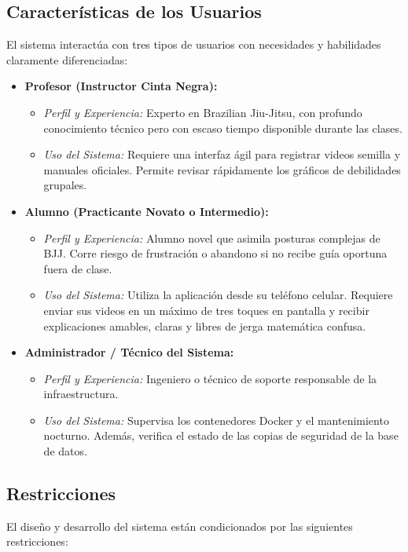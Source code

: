 \documentclass[12pt,letterpaper]{article}
\begin{document}
\subsection{Características de los Usuarios}
El sistema interactúa con tres tipos de usuarios con necesidades y habilidades claramente diferenciadas:

\begin{itemize}
    \item \textbf{Profesor (Instructor Cinta Negra):}
    \begin{itemize}
        \item \textit{Perfil y Experiencia:} Experto en Brazilian Jiu-Jitsu, con profundo conocimiento técnico pero con escaso tiempo disponible durante las clases.
        \item \textit{Uso del Sistema:} Requiere una interfaz ágil para registrar videos semilla y manuales oficiales. Permite revisar rápidamente los gráficos de debilidades grupales.
    \end{itemize}
    \item \textbf{Alumno (Practicante Novato o Intermedio):}
    \begin{itemize}
        \item \textit{Perfil y Experiencia:} Alumno novel que asimila posturas complejas de BJJ. Corre riesgo de frustración o abandono si no recibe guía oportuna fuera de clase.
        \item \textit{Uso del Sistema:} Utiliza la aplicación desde su teléfono celular. Requiere enviar sus videos en un máximo de tres toques en pantalla y recibir explicaciones amables, claras y libres de jerga matemática confusa.
    \end{itemize}
    \item \textbf{Administrador / Técnico del Sistema:}
    \begin{itemize}
        \item \textit{Perfil y Experiencia:} Ingeniero o técnico de soporte responsable de la infraestructura.
        \item \textit{Uso del Sistema:} Supervisa los contenedores Docker y el mantenimiento nocturno. Además, verifica el estado de las copias de seguridad de la base de datos.
    \end{itemize}
\end{itemize}

\subsection{Restricciones}
El diseño y desarrollo del sistema están condicionados por las siguientes restricciones:
\end{document}
